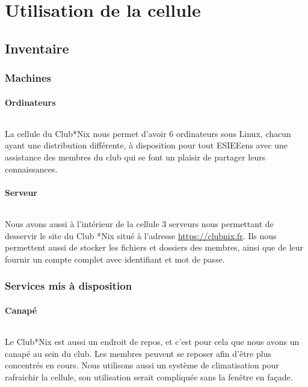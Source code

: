 \documentclass[11pt]{report}
\begin{document}
\part{Utilisation de la cellule}

\chapter{Inventaire}

\section{Machines}

\subsection{Ordinateurs}

\paragraph{} La cellule du Club*Nix nous permet d'avoir 6 ordinateurs sous
Linux, chacun ayant une distribution différente, à disposition pour tout
ESIEEens avec une assistance des membres du club qui se font un plaisir de
partager leurs connaissances.

\subsection{Serveur}

\paragraph{} Nous avons aussi à l'intérieur de la cellule 3 serveurs nous
permettant de desservir le site du Club *Nix situé à l'adresse
\url{https://clubnix.fr}. Ils nous permettent aussi de stocker les fichiers et
dossiers des membres, ainsi que de leur fournir un compte complet avec
identifiant et mot de passe.

\section{Services mis à disposition}

\subsection{Canapé}

\paragraph{} Le Club*Nix est aussi un endroit de repos, et c'est pour cela que
nous avons un canapé au sein du club. Les membres peuvent se reposer afin
d'être plus concentrés en cours. Nous utilisons aussi un système de
climatisation pour rafraichir la cellule, son utilisation serait compliquée
sans la fenêtre en façade.
\end{document}
